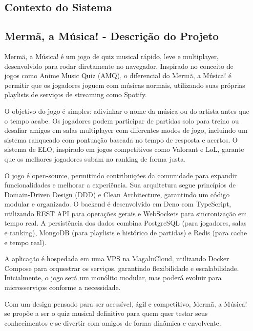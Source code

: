 \begin{titlepage}

\section{Contexto do Sistema}

\subsection{Mermã, a Música! - Descrição do Projeto}

Mermã, a Música! é um jogo de quiz musical rápido, leve e multiplayer, desenvolvido para rodar diretamente no navegador. Inspirado no conceito de jogos como Anime Music Quiz (AMQ), o diferencial do Mermã, a Música! é permitir que os jogadores joguem com músicas normais, utilizando suas próprias playlists de serviços de streaming como Spotify.

O objetivo do jogo é simples: adivinhar o nome da música ou do artista antes que o tempo acabe. Os jogadores podem participar de partidas solo para treino ou desafiar amigos em salas multiplayer com diferentes modos de jogo, incluindo um sistema ranqueado com pontuação baseada no tempo de resposta e acertos. O sistema de ELO, inspirado em jogos competitivos como Valorant e LoL, garante que os melhores jogadores subam no ranking de forma justa.

O jogo é open-source, permitindo contribuições da comunidade para expandir funcionalidades e melhorar a experiência. Sua arquitetura segue princípios de Domain-Driven Design (DDD) e Clean Architecture, garantindo um código modular e organizado. O backend é desenvolvido em Deno com TypeScript, utilizando REST API para operações gerais e WebSockets para sincronização em tempo real. A persistência dos dados combina PostgreSQL (para jogadores, salas e ranking), MongoDB (para playlists e histórico de partidas) e Redis (para cache e tempo real).

A aplicação é hospedada em uma VPS na MagaluCloud, utilizando Docker Compose para orquestrar os serviços, garantindo flexibilidade e escalabilidade. Inicialmente, o jogo será um monólito modular, mas poderá evoluir para microsserviços conforme a necessidade.

Com um design pensado para ser acessível, ágil e competitivo, Mermã, a Música! se propõe a ser o quiz musical definitivo para quem quer testar seus conhecimentos e se divertir com amigos de forma dinâmica e envolvente.


\end{titlepage}
